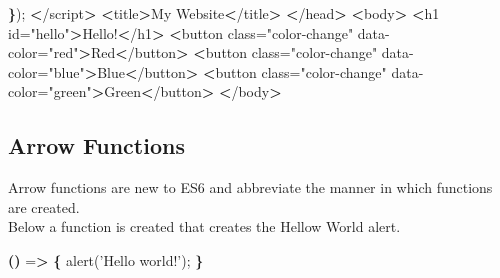 \documentclass[]{book}
\newenvironment{Shaded}{\begin{snugshade}}{\end{snugshade}}
\newcommand{\ExtensionTok}[1]{#1}
\newcommand{\KeywordTok}[1]{\textcolor[rgb]{0.13,0.29,0.53}{\textbf{#1}}}
\newcommand{\NormalTok}[1]{#1}
\newcommand{\OperatorTok}[1]{\textcolor[rgb]{0.81,0.36,0.00}{\textbf{#1}}}
\newcommand{\StringTok}[1]{\textcolor[rgb]{0.31,0.60,0.02}{#1}}
\begin{document}
\begin{Shaded}
\begin{Highlighting}[]
        \KeywordTok{\}}\NormalTok{);                                                                             }
    \OperatorTok{<}\NormalTok{/}\ExtensionTok{script}\OperatorTok{>}                                                                           
    \OperatorTok{<}\ExtensionTok{title}\OperatorTok{>}\NormalTok{My Website}\OperatorTok{<}\NormalTok{/title}\OperatorTok{>}                                                           
\OperatorTok{<}\NormalTok{/}\ExtensionTok{head}\OperatorTok{>}                                                                                 
\OperatorTok{<}\ExtensionTok{body}\OperatorTok{>}                                                                                  
    \OperatorTok{<}\ExtensionTok{h1}\NormalTok{ id=}\StringTok{"hello"}\OperatorTok{>}\NormalTok{Hello!}\OperatorTok{<}\NormalTok{/h1}\OperatorTok{>}                                                          
    \OperatorTok{<}\ExtensionTok{button}\NormalTok{ class=}\StringTok{"color-change"}\NormalTok{ data-color=}\StringTok{"red"}\OperatorTok{>}\NormalTok{Red}\OperatorTok{<}\NormalTok{/button}\OperatorTok{>}                          
    \OperatorTok{<}\ExtensionTok{button}\NormalTok{ class=}\StringTok{"color-change"}\NormalTok{ data-color=}\StringTok{"blue"}\OperatorTok{>}\NormalTok{Blue}\OperatorTok{<}\NormalTok{/button}\OperatorTok{>}                        
    \OperatorTok{<}\ExtensionTok{button}\NormalTok{ class=}\StringTok{"color-change"}\NormalTok{ data-color=}\StringTok{"green"}\OperatorTok{>}\NormalTok{Green}\OperatorTok{<}\NormalTok{/button}\OperatorTok{>}                      
\OperatorTok{<}\NormalTok{/}\ExtensionTok{body}\OperatorTok{>}                                                                                 
\end{Highlighting}
\end{Shaded}

\hypertarget{arrow-functions}{%
\subsection{Arrow Functions}\label{arrow-functions}}

Arrow functions are new to ES6 and abbreviate the manner in which functions are created.\\
Below a function is created that creates the Hellow World alert.

\begin{Shaded}
\begin{Highlighting}[]
\KeywordTok{()}\NormalTok{ =}\OperatorTok{>} \KeywordTok{\{}
    \ExtensionTok{alert}\NormalTok{(}\StringTok{'Hello world!'}\NormalTok{);}
\KeywordTok{\}}
\end{Highlighting}
\end{Shaded}
\end{document}
